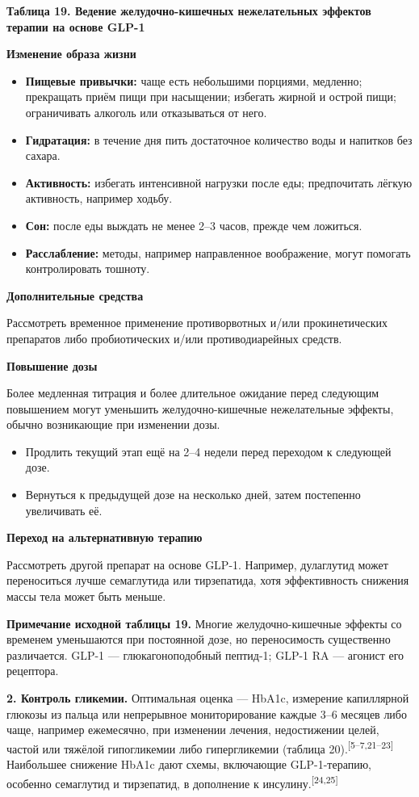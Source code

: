 \documentclass[11pt,a4paper]{article}
\newcommand{\src}[1]{\textsuperscript{[#1]}}
\newcommand{\heading}[1]{\par\medskip\textbf{#1}\par}
\begin{document}
\heading{Таблица 19. Ведение желудочно-кишечных нежелательных эффектов терапии на основе GLP-1}
\heading{Изменение образа жизни}
\begin{itemize}
\item \textbf{Пищевые привычки:} чаще есть небольшими порциями, медленно; прекращать приём пищи при насыщении; избегать жирной и острой пищи; ограничивать алкоголь или отказываться от него.
\item \textbf{Гидратация:} в течение дня пить достаточное количество воды и напитков без сахара.
\item \textbf{Активность:} избегать интенсивной нагрузки после еды; предпочитать лёгкую активность, например ходьбу.
\item \textbf{Сон:} после еды выждать не менее 2--3 часов, прежде чем ложиться.
\item \textbf{Расслабление:} методы, например направленное воображение, могут помогать контролировать тошноту.
\end{itemize}
\heading{Дополнительные средства}
Рассмотреть временное применение противорвотных и/или прокинетических препаратов либо пробиотических и/или противодиарейных средств.
\heading{Повышение дозы}
Более медленная титрация и более длительное ожидание перед следующим повышением могут уменьшить желудочно-кишечные нежелательные эффекты, обычно возникающие при изменении дозы.
\begin{itemize}
\item Продлить текущий этап ещё на 2--4 недели перед переходом к следующей дозе.
\item Вернуться к предыдущей дозе на несколько дней, затем постепенно увеличивать её.
\end{itemize}
\heading{Переход на альтернативную терапию}
Рассмотреть другой препарат на основе GLP-1. Например, дулаглутид может переноситься лучше семаглутида или тирзепатида, хотя эффективность снижения массы тела может быть меньше.

\textbf{Примечание исходной таблицы 19.} Многие желудочно-кишечные эффекты со временем уменьшаются при постоянной дозе, но переносимость существенно различается. GLP-1 --- глюкагоноподобный пептид-1; GLP-1 RA --- агонист его рецептора.

\textbf{2. Контроль гликемии.} Оптимальная оценка --- HbA1c, измерение капиллярной глюкозы из пальца или непрерывное мониторирование каждые 3--6 месяцев либо чаще, например ежемесячно, при изменении лечения, недостижении целей, частой или тяжёлой гипогликемии либо гипергликемии (таблица 20).\src{5--7,21--23} Наибольшее снижение HbA1c дают схемы, включающие GLP-1-терапию, особенно семаглутид и тирзепатид, в дополнение к инсулину.\src{24,25}
\end{document}

